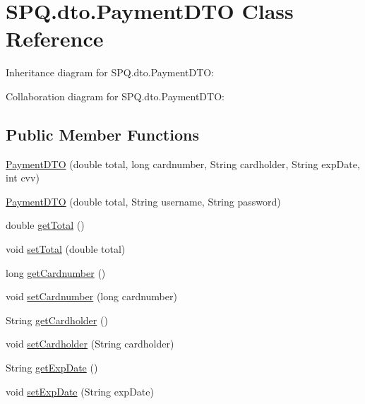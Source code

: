 \hypertarget{class_s_p_q_1_1dto_1_1_payment_d_t_o}{}\section{S\+P\+Q.\+dto.\+Payment\+D\+TO Class Reference}
\label{class_s_p_q_1_1dto_1_1_payment_d_t_o}


Inheritance diagram for S\+P\+Q.\+dto.\+Payment\+D\+TO\+:


Collaboration diagram for S\+P\+Q.\+dto.\+Payment\+D\+TO\+:
\subsection*{Public Member Functions}
\begin{DoxyCompactItemize}
\item 
\mbox{\hyperlink{class_s_p_q_1_1dto_1_1_payment_d_t_o_a4a6f91d0976ce0af97a8f7f15658294c}{Payment\+D\+TO}} (double total, long cardnumber, String cardholder, String exp\+Date, int cvv)
\item 
\mbox{\hyperlink{class_s_p_q_1_1dto_1_1_payment_d_t_o_ab51beb9eef60e0b57b11bab85ce42454}{Payment\+D\+TO}} (double total, String username, String password)
\item 
double \mbox{\hyperlink{class_s_p_q_1_1dto_1_1_payment_d_t_o_a04cd2104d07971407126fcf75ef17d5b}{get\+Total}} ()
\item 
void \mbox{\hyperlink{class_s_p_q_1_1dto_1_1_payment_d_t_o_a07f242511a5b2cd45fdf771203729c1b}{set\+Total}} (double total)
\item 
long \mbox{\hyperlink{class_s_p_q_1_1dto_1_1_payment_d_t_o_ac2a8a2ab315f3027f25780a84da0b824}{get\+Cardnumber}} ()
\item 
void \mbox{\hyperlink{class_s_p_q_1_1dto_1_1_payment_d_t_o_a2b84f1e7da9d3d9966d5170ae0595839}{set\+Cardnumber}} (long cardnumber)
\item 
String \mbox{\hyperlink{class_s_p_q_1_1dto_1_1_payment_d_t_o_ac4812465bc4dd874aad6269fe8486e0b}{get\+Cardholder}} ()
\item 
void \mbox{\hyperlink{class_s_p_q_1_1dto_1_1_payment_d_t_o_a5eea0a93b97ba73b36358c6f5e0ca42e}{set\+Cardholder}} (String cardholder)
\item 
String \mbox{\hyperlink{class_s_p_q_1_1dto_1_1_payment_d_t_o_aa91402a8c96a306fcf125973e4f35912}{get\+Exp\+Date}} ()
\item 
void \mbox{\hyperlink{class_s_p_q_1_1dto_1_1_payment_d_t_o_a6d3d88f07321648bc17e385432ee9044}{set\+Exp\+Date}} (String exp\+Date)

\end{DoxyCompactItemize}

